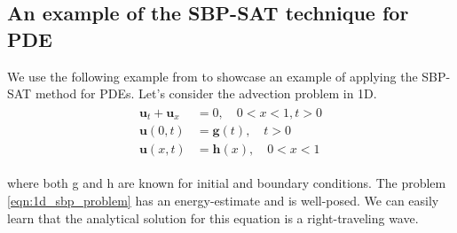 \subsection{An example of the SBP-SAT technique for PDE}
We use the following example from \citep{RUGGIU2018216} to showcase an example of applying the SBP-SAT method for PDEs. Let's consider the advection problem in 1D.
\begin{align}
    \begin{split}
    \boldsymbol{u}_t + \boldsymbol{u}_x &= 0, \quad 0 < x < 1,  t > 0 \\
    \boldsymbol{u}(0,t) &=  \boldsymbol{g}(t),  \quad  t > 0 \\
    \boldsymbol{u}(x,t) &= \boldsymbol{h}(x), \quad 0 < x < 1
    \end{split}
     \label{eqn:1d_sbp_problem}
\end{align}

where both g and h are known for initial and boundary conditions. The problem \autoref{eqn:1d_sbp_problem} has an energy-estimate and is well-posed. We can easily learn that the analytical solution for this equation is a right-traveling wave.

